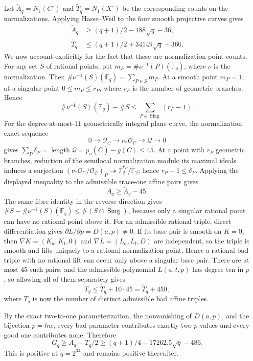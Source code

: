 \documentclass[11pt]{article}
\theoremstyle{definition}\newtheorem{definition}[theorem]{Definition}
\theoremstyle{remark}\newtheorem{remark}[theorem]{Remark}
\newcommand{\F}{\mathbb F}
\begin{document}
Let \(\widetilde A_q=N_1(C^\circ)\) and
\(\widetilde T_q=N_1(X^\circ)\) be the corresponding counts on the
normalizations.  Applying Hasse--Weil
\cite[Theorem~5.2.3]{stichtenoth} to the four smooth projective curves
gives
\begin{align}
 \widetilde A_q&\geq(q+1)/2-188\sqrt q-36,\label{eq:Aq}\\
 \widetilde T_q&\leq(q+1)/2+34149\sqrt q+360.\label{eq:Tq}
\end{align}
We now account explicitly for the fact that these are normalization-point
counts.  For any set \(S\) of rational
points, put \(m_P=\#\nu^{-1}(P)(\F_q)\), where \(\nu\) is the normalization.
Then \(\#\nu^{-1}(S)(\F_q)=\sum_{P\in S}m_P\).  At a smooth point \(m_P=1\);
at a singular point \(0\leq m_P\leq r_P\), where \(r_P\) is the number of
geometric branches.  Hence
\[
 \#\nu^{-1}(S)(\F_q)-\#S
 \leq\sum_{P\in\operatorname{Sing}}(r_P-1).
\]
For the degree-at-most-\(11\) geometrically integral plane curve, the
normalization exact sequence
\[
 0\longrightarrow\mathcal O_{\overline C}
 \longrightarrow\nu_*\mathcal O_C\longrightarrow\mathcal Q\longrightarrow0
\]
gives
\(\sum_P\delta_P=\operatorname{length}\mathcal Q
=p_a(\overline C)-g(C)\leq45\).
At a point with \(r_P\) geometric branches, reduction of the semilocal
normalization modulo its maximal ideals induces a surjection
\((\nu_*\mathcal O_C/\mathcal O_{\overline C})_P
\twoheadrightarrow\overline{\F}_2^{r_P}/\overline{\F}_2\); hence
\(r_P-1\leq\delta_P\).  Applying the displayed inequality to the admissible
trace-one affine pairs gives
\[
 A_q\geq\widetilde A_q-45.
\]
The same fibre identity in the reverse direction gives
\(\#S-\#\nu^{-1}(S)(\F_q)\leq\#(S\cap\operatorname{Sing})\), because only a
singular rational point can have no rational point above it.  For an
admissible rational triple, direct differentiation gives
\(\partial L/\partial p=D(a,p)\neq0\).  If its base pair is smooth on
\(K=0\), then \(\nabla K=(K_a,K_t,0)\) and
\(\nabla L=(L_a,L_t,D)\) are independent, so the triple is smooth and lifts
uniquely to a rational normalization point.  Hence a rational bad triple
with no rational lift can occur only above a singular base pair.  There are
at most \(45\) such pairs, and the admissible polynomial \(L(a,t,p)\) has
degree ten in \(p\), so allowing all of them separately gives
\[
 T_q\leq\widetilde T_q+10\cdot45=\widetilde T_q+450,
\]
where \(T_q\) is now the number of distinct admissible bad affine triples.

By the exact two-to-one parameterization, the nonvanishing of \(D(a,p)\), and
the bijection \(p=hw\), every bad parameter contributes exactly two
\(p\)-values and every good one contributes none.  Therefore
\begin{equation}
 G_q\geq A_q-T_q/2
 \geq(q+1)/4-17262.5\sqrt q-486.
 \label{eq:Gq}
\end{equation}
This is positive at \(q=2^{34}\) and remains positive thereafter.
\end{document}
